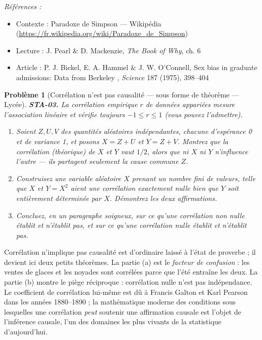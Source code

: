 \documentclass[11pt]{article}
\newtheorem{problem}{Problème}
\newenvironment{refs}{\par\small\noindent\emph{Références :}\begin{itemize}\setlength\itemsep{0pt}}{\end{itemize}\normalsize}
\begin{document}
\begin{refs}
\item Contexte : Paradoxe de Simpson --- Wikipédia (\url{https://fr.wikipedia.org/wiki/Paradoxe_de_Simpson})
\item Lecture : J. Pearl \& D. Mackenzie, \textit{The Book of Why}, ch. 6
\item Article : P. J. Bickel, E. A. Hammel \& J. W. O'Connell, \og{} Sex bias in graduate admissions: Data from Berkeley \fg{}, \textit{Science} 187 (1975), 398--404
\end{refs}

\bigskip

\begin{problem}[{Corrélation n'est pas causalité --- sous forme de théorème --- Lycée}]
\textbf{STA-03.} La corrélation empirique $ r $ de données appariées mesure l'association
linéaire et vérifie toujours $ -1 \le r \le 1 $ (vous pouvez l'admettre).
\begin{enumerate}
\item[(a)] Soient $ Z, U, V $ des quantités aléatoires indépendantes, chacune d'espérance 0 et de
variance 1, et posons $ X = Z + U $ et $ Y = Z + V $. Montrez que la corrélation
(théorique) de $ X $ et $ Y $ vaut $ 1/2 $, alors que ni $ X $ ni $ Y $ n'influence
l'autre --- ils partagent seulement la cause commune $ Z $.
\item[(b)] Construisez une variable aléatoire $ X $ prenant un nombre fini de valeurs, telle que
$ X $ et $ Y = X^2 $ aient une corrélation exactement nulle bien que $ Y $ soit entièrement
déterminée par $ X $. Démontrez les deux affirmations.
\item[(c)] Concluez, en un paragraphe soigneux, sur ce qu'une corrélation non nulle établit et n'établit
pas, et sur ce qu'une corrélation nulle établit et n'établit pas.
\end{enumerate}

\end{problem}

\noindent \og{} Corrélation n'implique pas causalité \fg{} est d'ordinaire laissé à l'état de
proverbe ; il devient ici deux petits théorèmes. La partie (a) est le \textit{facteur de confusion} :
les ventes de glaces et les noyades sont corrélées parce que l'été entraîne les deux. La partie (b)
montre le piège réciproque : corrélation nulle n'est pas indépendance. Le coefficient de
corrélation lui-même est dû à Francis Galton et Karl Pearson dans les années 1880--1890 ; la
mathématique moderne des conditions sous lesquelles une corrélation \textit{peut} soutenir une
affirmation causale est l'objet de l'inférence causale, l'un des domaines les plus vivants de la
statistique d'aujourd'hui.
\end{document}
